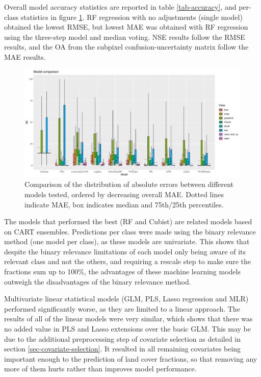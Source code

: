 \documentclass[a4paper,10pt]{article}
\begin{document}
Overall model accuracy statistics are reported in table \ref{tab-accuracy}, and per-class statistics in figure \ref{fig-models}.
\Gls{RF} regression with no adjustments (single model) obtained the lowest \gls{RMSE}, but lowest \gls{MAE} was obtained with \gls{RF} regression using the three-step model and median voting.
\gls{NSE} results follow the \gls{RMSE} results, and the \gls{OA} from the subpixel confusion-uncertainty matrix follow the \gls{MAE} results.

\begin{figure}
    \includegraphics[width=\textwidth]{article-figures/boxplots/2020-05-08-model-comparison-bar}
    \caption{Comparison of the distribution of absolute errors between different models tested, ordered by decreasing overall \gls{MAE}. Dotted lines indicate \gls{MAE}, box indicates median and 75th/25th percentiles.}
    \label{fig-models}
\end{figure}

The models that performed the best (\gls{RF} and Cubist) are related models based on \gls{CART} ensembles.
Predictions per class were made using the binary relevance method (one model per class), as these models are univariate.
This shows that despite the binary relevance limitations of each model only being aware of its relevant class and not the others, and requiring a rescale step to make sure the fractions sum up to 100\%, the advantages of these machine learning models outweigh the disadvantages of the binary relevance method.

Multivariate linear statistical models (\gls{GLM}, \gls{PLS}, Lasso regression and \gls{MLR}) performed significantly worse, as they are limited to a linear approach.
The results of all of the linear models were very similar, which shows that there was no added value in \gls{PLS} and Lasso extensions over the basic \gls{GLM}.
This may be due to the additional preprocessing step of covariate selection as detailed in section \ref{sec-covariate-selection}.
It resulted in all remaining covariates being important enough to the prediction of land cover fractions, so that removing any more of them hurts rather than improves model performance.
\end{document}

